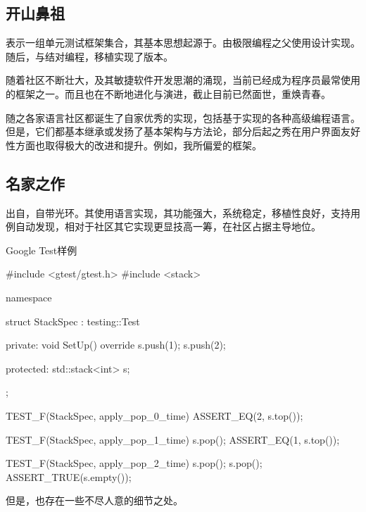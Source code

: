 \begin{content}

\subsection{开山鼻祖}

表示一组单元测试框架集合，其基本思想起源于。由极限编程之父使用设计实现。随后，与结对编程，移植实现了版本。

随着社区不断壮大，及其敏捷软件开发思潮的涌现，当前已经成为程序员最常使用的框架之一。而且也在不断地进化与演进，截止目前已然面世，重焕青春。

随之各家语言社区都诞生了自家优秀的实现，包括基于实现的各种高级编程语言。但是，它们都基本继承或发扬了基本架构与方法论，部分后起之秀在用户界面友好性方面也取得极大的改进和提升。例如，我所偏爱的框架。

\subsection{名家之作}

出自，自带光环。其使用\cpp{}语言实现，其功能强大，系统稳定，移植性良好，支持用例自动发现，相对于\cpp{}社区其它实现更显技高一筹，在\cpp{}社区占据主导地位。

\begin{nodiff}{Google Test样例}
 \begin{c++}
#include <gtest/gtest.h>
#include <stack>

namespace {
  struct StackSpec : testing::Test {
  private:
    void SetUp() override {
      s.push(1);
      s.push(2);
    }

  protected:
    std::stack<int> s;
  };
}

TEST_F(StackSpec, apply_pop_0_time) {
  ASSERT_EQ(2, s.top());
}

TEST_F(StackSpec, apply_pop_1_time) {
  s.pop();
  ASSERT_EQ(1, s.top());
}

TEST_F(StackSpec, apply_pop_2_time) {
  s.pop();
  s.pop();
  ASSERT_TRUE(s.empty());
}
 \end{c++}
\end{nodiff}

但是，也存在一些不尽人意的细节之处。


\end{content}
